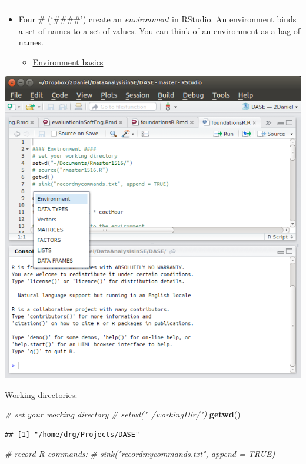 \documentclass[]{book}
\newenvironment{Shaded}{\begin{snugshade}}{\end{snugshade}}
\newcommand{\KeywordTok}[1]{\textcolor[rgb]{0.13,0.29,0.53}{\textbf{{#1}}}}
\newcommand{\CommentTok}[1]{\textcolor[rgb]{0.56,0.35,0.01}{\textit{{#1}}}}
\newcommand{\NormalTok}[1]{{#1}}
\providecommand{\tightlist}{%
  \setlength{\itemsep}{0pt}\setlength{\parskip}{0pt}}
\begin{document}
\begin{center}\rule{0.5\linewidth}{\linethickness}\end{center}

\begin{itemize}
\tightlist
\item
  Four \# (`\#\#\#\#') create an \emph{environment} in RStudio. An
  environment binds a set of names to a set of values. You can think of
  an environment as a bag of names.

  \begin{itemize}
  \tightlist
  \item
    \href{http://adv-r.had.co.nz/Environments.html\#env-basics}{Environment
    basics}
  \end{itemize}
\end{itemize}

\includegraphics[width=0.75\linewidth]{figures/environments}

Working directories:

\begin{Shaded}
\begin{Highlighting}[]
\CommentTok{# set your working directory}
\CommentTok{# setwd("~/workingDir/")}
\KeywordTok{getwd}\NormalTok{()}
\end{Highlighting}
\end{Shaded}

\begin{verbatim}
## [1] "/home/drg/Projects/DASE"
\end{verbatim}

\begin{Shaded}
\begin{Highlighting}[]
\CommentTok{# record R commands:}
\CommentTok{# sink("recordmycommands.txt", append = TRUE)}
\end{Highlighting}
\end{Shaded}
\end{document}
